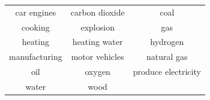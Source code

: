 \documentclass[answers,12pt]{exam}
\begin{document}
\begin{tabular}{ |c c c|}
    \hline
    car engines     & carbon dioxide    & coal\\ 
    cooking         & explosion         & gas\\ 
    heating         & heating water     & hydrogen\\ 
    manufacturing   & motor vehicles    & natural gas\\ 
    oil             & oxygen            & produce electricity\\ 
    water           & wood              & \\ 
    \hline    
\end{tabular}




















    
    
\end{document}

